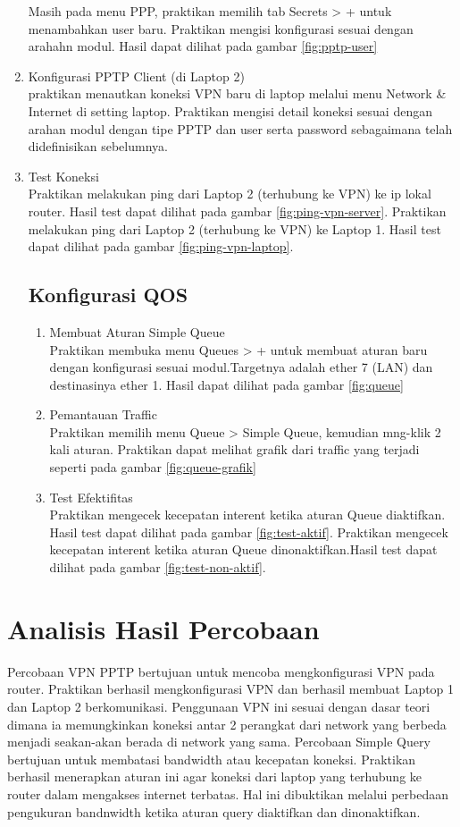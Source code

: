 \begin{enumerate}
  Masih pada menu PPP, praktikan memilih tab Secrets > + untuk menambahkan user baru. Praktikan mengisi konfigurasi sesuai dengan arahahn modul. Hasil dapat dilihat pada gambar \ref{fig:pptp-user}
  \item Konfigurasi PPTP Client  (di Laptop 2)\\
  praktikan menautkan koneksi VPN baru di laptop melalui menu Network \& Internet di setting laptop. Praktikan mengisi detail koneksi sesuai dengan arahan modul dengan tipe PPTP dan user serta password sebagaimana telah didefinisikan sebelumnya.
  \item Test Koneksi \\
  Praktikan melakukan ping dari Laptop 2 (terhubung ke VPN) ke ip lokal router. Hasil test dapat dilihat pada gambar \ref{fig:ping-vpn-server}.
  Praktikan melakukan ping dari Laptop 2 (terhubung ke VPN) ke Laptop 1. Hasil test dapat dilihat pada gambar \ref{fig:ping-vpn-laptop}.

  \subsection{Konfigurasi QOS}
  \begin{enumerate}
    \item Membuat Aturan Simple Queue \\
    Praktikan membuka menu Queues > + untuk membuat aturan baru dengan konfigurasi sesuai modul.Targetnya adalah ether 7 (LAN) dan destinasinya ether 1. Hasil dapat dilihat pada gambar \ref{fig:queue}
    \item Pemantauan Traffic \\
    Praktikan memilih menu Queue > Simple Queue, kemudian mng-klik 2 kali aturan. Praktikan dapat melihat grafik dari traffic yang terjadi seperti pada gambar \ref{fig:queue-grafik}
    \item Test Efektifitas \\
    Praktikan mengecek kecepatan interent ketika aturan Queue diaktifkan. Hasil test dapat dilihat pada gambar \ref{fig:test-aktif}.
    Praktikan mengecek kecepatan interent ketika aturan Queue dinonaktifkan.Hasil test dapat dilihat pada gambar \ref{fig:test-non-aktif}.
  \end{enumerate}
\end{enumerate}

\section{Analisis Hasil Percobaan}
Percobaan VPN PPTP bertujuan untuk mencoba mengkonfigurasi VPN pada router. Praktikan berhasil mengkonfigurasi VPN dan berhasil membuat Laptop 1 dan Laptop 2 berkomunikasi. Penggunaan VPN ini sesuai dengan dasar teori dimana ia memungkinkan koneksi antar 2 perangkat dari network yang berbeda menjadi seakan-akan berada di network yang sama. Percobaan Simple Query bertujuan untuk membatasi bandwidth atau kecepatan koneksi. Praktikan berhasil menerapkan aturan ini agar koneksi dari laptop yang terhubung ke router dalam mengakses internet terbatas. Hal ini dibuktikan melalui perbedaan pengukuran bandnwidth ketika aturan query diaktifkan dan dinonaktifkan. 

